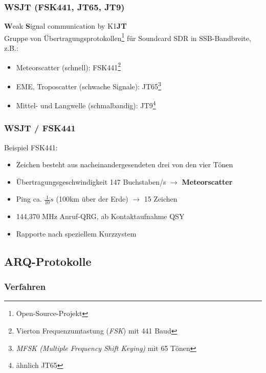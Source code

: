 \begin{frame}
    \frametitle{WSJT (FSK441, JT65, JT9)}

    \textbf{W}eak \textbf{S}ignal communication by K1\textbf{JT} \\[2em]

    Gruppe von Übertragungsprotokollen\footnote{Open-Source-Projekt} für
    Soundcard SDR in SSB-Bandbreite, z.B.:
    
    \begin{itemize}
        \item Meteorscatter (schnell): FSK441\footnote{Vierton Frequenzumtastung
              (\emph{FSK}) mit 441 Baud}
        \item EME, Troposcatter (schwache Signale): JT65\footnote{\emph{MFSK
              (Multiple Frequency Shift Keying)} mit 65 Tönen}
        \item Mittel- und Langwelle (schmalbandig): JT9\footnote{ähnlich JT65}
    \end{itemize}

\end{frame}

\begin{frame}
    \frametitle{WSJT / FSK441}

    Beispiel FSK441:

    \begin{itemize}
        \item Zeichen besteht aus nacheinandergesendeten drei von den vier Tönen
        \item Übertragungsgeschwindigkeit 147 Buchstaben/s $\rightarrow$
              \textbf{Meteorscatter}
        \item Ping ca. $\frac{1}{10}s$ (100km über der Erde) $\rightarrow$ 15 Zeichen
        \item 144,370 MHz Anruf-QRG, ab Kontaktaufnahme QSY
        \item Rapporte nach speziellem Kurzzystem
    \end{itemize}

\end{frame}

\subsection{ARQ-Protokolle}

\subsubsection{Verfahren}

